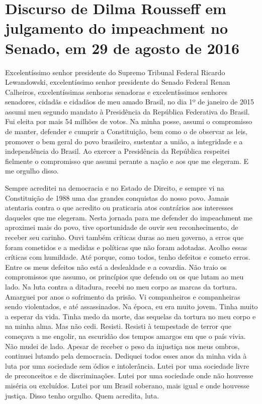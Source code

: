 \chapter*{Discurso de Dilma Rousseff em julgamento do impeachment no Senado, em 29
de agosto de 2016}


Excelentíssimo senhor presidente do Supremo Tribunal Federal Ricardo
Lewandowski, excelentíssimo senhor presidente do Senado Federal Renan
Calheiros, excelentíssimas senhoras senadoras e excelentíssimos senhores
senadores, cidadãs e cidadãos de meu amado Brasil, no dia 1º de janeiro
de 2015 assumi meu segundo mandato à Presidência da República Federativa
do Brasil. Fui eleita por mais 54 milhões de votos. Na minha posse,
assumi o compromisso de manter, defender e cumprir a Constituição, bem
como o de observar as leis, promover o bem geral do povo brasileiro,
sustentar a união, a integridade e a independência do Brasil. Ao exercer
a Presidência da República respeitei fielmente o compromisso que assumi
perante a nação e aos que me elegeram. E me orgulho disso.

Sempre
acreditei na democracia e no Estado de Direito, e sempre vi na
Constituição de 1988 uma das grandes conquistas do nosso povo. Jamais
atentaria contra o que acredito ou praticaria atos contrários aos
interesses daqueles que me elegeram. Nesta jornada para me defender do
impeachment me aproximei mais do povo, tive oportunidade de ouvir
seu reconhecimento, de receber seu carinho. Ouvi também críticas duras
ao meu governo, a erros que foram cometidos e a medidas e políticas que
não foram adotadas. Acolho essas críticas com humildade. Até porque,
como todos, tenho defeitos e cometo erros. Entre os meus defeitos não
está a deslealdade e a covardia. Não traio os compromissos que assumo,
os princípios que defendo ou os que lutam ao meu lado. Na luta contra a
ditadura, recebi no meu corpo as marcas da tortura. Amarguei por anos o
sofrimento da prisão. Vi companheiros e companheiras sendo violentados,
e até assassinados. Na época, eu era muito jovem. Tinha muito a esperar
da vida. Tinha medo da morte, das sequelas da tortura no meu corpo e na
minha alma. Mas não cedi. Resisti. Resisti à tempestade de terror que
começava a me engolir, na escuridão dos tempos amargos em que o país
vivia. Não mudei de lado. Apesar de receber o peso da injustiça nos meus
ombros, continuei lutando pela democracia. Dediquei todos esses anos da
minha vida à luta por uma sociedade sem ódios e intolerância. Lutei por
uma sociedade livre de preconceitos e de discriminações. Lutei por uma
sociedade onde não houvesse miséria ou excluídos. Lutei por um Brasil
soberano, mais igual e onde houvesse justiça. Disso tenho orgulho. Quem
acredita, luta.

